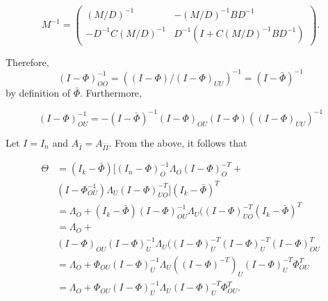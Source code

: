 \documentclass[accepted]{uai2021} %
\begin{document}
$$
M^{-1}=
\begin{pmatrix}
(M/D)^{-1} & -(M/D)^{-1}BD^{-1} \\
-D^{-1}C(M/D)^{-1} & D^{-1}(I + C(M/D)^{-1}BD^{-1})
\end{pmatrix}.
$$

Therefore, $$(I - {\Phi})_{OO}^{-1} = ((I - {\Phi})/(I - 
{\Phi})_{UU})^{-1} = (I- \bar{\Phi})^{-1}$$ by definition of 
$\bar{\Phi}$. 
Furthermore, 

$$
(I-{\Phi})_{OU}^{-1} = 
-(I-\bar{\Phi})^{-1}(I-{\Phi})_{OU}(I-{\Phi})((I-{\Phi})_{UU})^{-1}
$$

Let $I = I_n$ and $A_{\bar{I}}=A_{\bar{I}\bar{I}}$. From the above, it 
follows 
that

\begin{align*}
\Theta & = (I_k - \bar{\Phi})[(I_n - 
{\Phi})_{O}^{-1}{\Lambda}_{O}(I - {\Phi})_{O}^{-T} + \\ 
&  
(I 
- 
{\Phi}_{OU}^{-1}){\Lambda}_{U}(I - 
{\Phi})_{UO}^{-T}](I_k - 
\bar{\Phi})^T \\
& = {\Lambda}_{O} + (I_k - \bar{\Phi})(I 
- 
{\Phi})_{OU}^{-1}{\Lambda}_{U}((I - 
{\Phi})_{UO}^{-T}(I_k - 
\bar{\Phi})^T \\
& = {\Lambda}_{O} + \\ & (I - {\Phi})_{OU}(I - 
{\Phi})_{U}^{-1}{\Lambda}_{U}((I - 
{\Phi})_{U}^{-T}(I - 
{\Phi})_{U}^{-T}(I - 
{\Phi})_{OU}^T \\
& = {\Lambda}_{O} + {\Phi}_{OU}(I - 
{\Phi})_{U}^{-1}{\Lambda}_{U}((I - 
{\Phi})^{-T})_{U}(I - 
{\Phi})_{U}^{-T} 
{\Phi}_{OU}^T \\
& = {\Lambda}_{O} + {\Phi}_{OU}(I - 
{\Phi})_{U}^{-1}{\Lambda}_{U} (I - 
{\Phi})_{U}^{-T}
{\Phi}_{OU}^T.
\end{align*}



\end{document}

